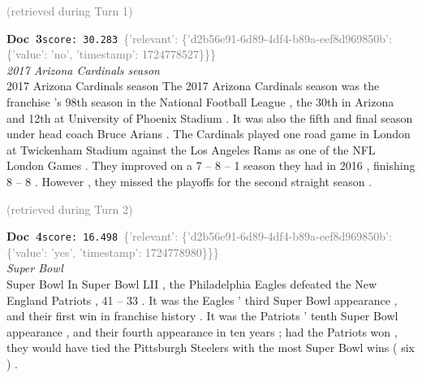 \documentclass[a4paper,11pt]{article}
\begin{document}
\hfill{\tiny\textcolor{gray}{(retrieved during Turn 1)}}
\begin{docenv}
{\footnotesize\textcolor{doccolor}{\textbf{Doc~3}}}\hfill{\tiny\texttt{score:~30.283}}\ {\tiny\textcolor{gray}{\{'relevant': \{'d2b56e91-6d89-4df4-b89a-eef8d969850b': \{'value': 'no', 'timestamp': 1724778527\}\}\}}}\\[3pt]
{\small\textit{2017 Arizona Cardinals season}}\\[2pt]
\vspace{2pt}
{\footnotesize 2017 Arizona Cardinals season
The 2017 Arizona Cardinals season was the franchise 's 98th season in the National Football League , the 30th in Arizona and 12th at University of Phoenix Stadium . It was also the fifth and final season under head coach Bruce Arians . The Cardinals played one road game in London at Twickenham Stadium against the Los Angeles Rams as one of the NFL London Games . They improved on a 7 -- 8 -- 1 season they had in 2016 , finishing 8 -- 8 . However , they missed the playoffs for the second straight season .}
\end{docenv}
\hfill{\tiny\textcolor{gray}{(retrieved during Turn 2)}}
\begin{docenv}
{\footnotesize\textcolor{doccolor}{\textbf{Doc~4}}}\hfill{\tiny\texttt{score:~16.498}}\ {\tiny\textcolor{gray}{\{'relevant': \{'d2b56e91-6d89-4df4-b89a-eef8d969850b': \{'value': 'yes', 'timestamp': 1724778980\}\}\}}}\\[3pt]
{\small\textit{Super Bowl}}\\[2pt]
\vspace{2pt}
{\footnotesize Super Bowl
In Super Bowl LII , the Philadelphia Eagles defeated the New England Patriots , 41 -- 33 . It was the Eagles ' third Super Bowl appearance , and their first win in franchise history . It was the Patriots ' tenth Super Bowl appearance , and their fourth appearance in ten years ; had the Patriots won , they would have tied the Pittsburgh Steelers with the most Super Bowl wins ( six ) .}
\end{docenv}
\end{document}
